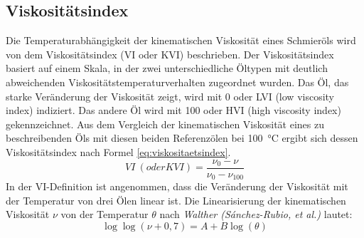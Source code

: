 \subsection*{Viskositätsindex}
\label{sub:Viskositaetsindex}
Die Temperaturabhängigkeit der kinematischen Viskosität eines Schmieröls wird von dem Viskositätsindex (VI oder KVI) beschrieben.
Der Viskositätsindex basiert auf einem Skala, in der zwei unterschiedliche Öltypen mit deutlich abweichenden Viskositätstemperaturverhalten zugeordnet wurden.
Das Öl, das starke Veränderung der Viskosität zeigt, wird mit \num{0} oder \si{LVI} (low viscosity index) indiziert.
Das andere Öl wird mit \num{100} oder \si{HVI} (high viscosity index) gekennzeichnet.
Aus dem Vergleich der kinematischen Viskosität eines zu beschreibenden Öls mit diesen beiden Referenzölen bei \SI{100}{\degreeCelsius}  ergibt sich dessen Viskositätsindex nach Formel \ref{eq:viskositaetsindex}.
\begin{equation}
    VI~(oder KVI) = \frac{\nu_0 - \nu}{\nu_0 - \nu_{100}}
    \label{eq:viskositaetsindex}
\end{equation}
%
In der VI-Definition ist angenommen, dass die Veränderung der Viskosität mit der Temperatur von drei Ölen linear ist.
Die Linearisierung der kinematischen Viskosität $\nu$ von der Temperatur $\theta$ nach \textit{Walther (S\'{a}nchez-Rubio, et al.)} \cite{sanchez-rubio} lautet:
\begin{equation}
    \label{eq:kinematische_viskotitaet_walther}
    \log \log(\nu + 0,7) = A + B \log(\theta)
\end{equation}
%

